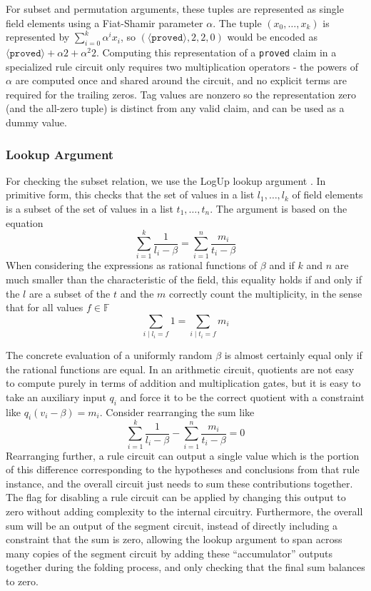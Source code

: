 \documentclass{article}
\theoremstyle{plain}
\theoremstyle{definition}
\begin{document}
For subset and permutation arguments, these tuples are represented as
single field elements using a Fiat-Shamir parameter $\alpha$.
The tuple $(x_0, \ldots, x_k)$ is represented by $\sum_{i=0}^k \alpha^ix_i$,
so $(\langle \texttt{proved} \rangle, 2, 2, 0)$ would be encoded as
$\langle \texttt{proved} \rangle + \alpha 2 + \alpha^2 2$.
Computing this representation of a \texttt{proved} claim in a specialized rule
circuit only requires two multiplication operators - the powers of
$\alpha$ are computed once and shared around the circuit, and no explicit
terms are required for the trailing zeros.
Tag values are nonzero so the representation zero (and the all-zero tuple)
is distinct from any valid claim, and can be used as a dummy value.

\subsubsection{Lookup Argument}

For checking the subset relation, we use the LogUp lookup argument \cite{logup}.
In primitive form, this checks that the set of values in a list
$l_1,\ldots,l_k$ of field elements is a subset of the set of values in a list
$t_1,\ldots,t_n$.
The argument is based on the equation
\[\sum_{i=1}^k \frac{1}{l_i - \beta} = \sum_{i=1}^n \frac{m_i}{t_i - \beta}\]
When considering the expressions as rational functions of $\beta$ and if
$k$ and $n$ are much smaller than the characteristic of the field,
this equality holds if and only if the $l$ are a subset of the $t$ and the $m$ 
correctly count the multiplicity, in the sense that for all values $f \in \mathbb{F}$
\[\sum_{i \mid l_i = f} 1 = \sum_{i \mid t_i = f} m_i\]

The concrete evaluation of a uniformly random $\beta$ is almost certainly equal
only if the rational functions are equal.
In an arithmetic circuit, quotients are not easy to compute purely in terms of addition and multiplication gates,
but it is easy to take an auxiliary input $q_i$ and force it to be the correct quotient
with a constraint like $q_i(v_i - \beta) = m_i$.
Consider rearranging the sum like
\[\sum_{i=1}^k \frac{1}{l_i - \beta} - \sum_{i=1}^n \frac{m_i}{t_i - \beta} = 0\]
Rearranging further, a rule circuit can output a single value which is the portion
of this difference corresponding to the hypotheses and conclusions from that rule instance,
and the overall circuit just needs to sum these contributions together.
The flag for disabling a rule circuit can be applied by changing this output to zero
without adding complexity to the internal circuitry.
Furthermore, the overall sum will be an output of the segment circuit, instead of
directly including a constraint that the sum is zero, allowing the lookup argument
to span across many copies of the segment circuit by adding these ``accumulator''
outputs together during the folding process, and only checking that the final
sum balances to zero.
\end{document}
